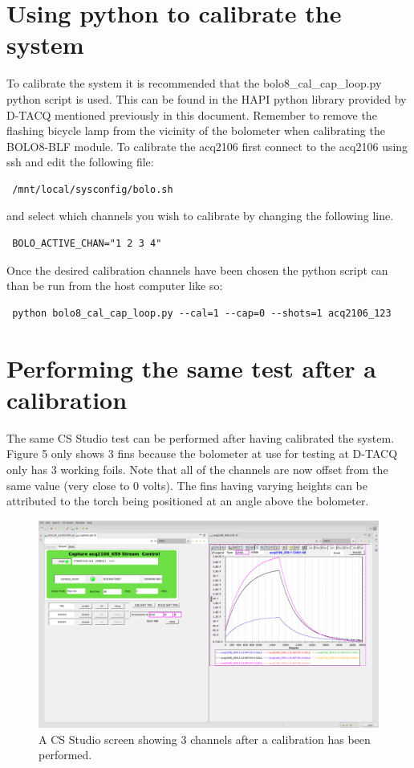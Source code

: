 \documentclass{article}
\begin{document}
\newpage

\section{Using python to calibrate the system}
To calibrate the system it is recommended that the bolo8\_cal\_cap\_loop.py python script is used.
This can be found in the HAPI python library provided by D-TACQ mentioned previously in this document.
Remember to remove the flashing bicycle lamp from the vicinity of the bolometer when calibrating the BOLO8-BLF module.
\newline
To calibrate the acq2106 first connect to the acq2106 using ssh and edit the following file:

\begin{verbatim} /mnt/local/sysconfig/bolo.sh \end{verbatim}

and select which channels you wish to calibrate by changing the following line.

\begin{verbatim} BOLO_ACTIVE_CHAN="1 2 3 4" \end{verbatim}

Once the desired calibration channels have been chosen the python script can than be run from the host computer like so:

\begin{verbatim} python bolo8_cal_cap_loop.py --cal=1 --cap=0 --shots=1 acq2106_123\end{verbatim}

\newpage

\section{Performing the same test after a calibration}
The same CS Studio test can be performed after having calibrated the system.
Figure 5 only shows 3 fins because the bolometer at use for testing at D-TACQ only has 3 working foils.
Note that all of the channels are now offset from the same value (very close to 0 volts).
The fins having varying heights can be attributed to the torch being positioned at an angle above the bolometer.

\begin{figure}
	\centering
	\includegraphics[width=5.0in]{images/3-fins.png}
	\caption{A CS Studio screen showing 3 channels after a calibration has been performed.}
	\label{boloZIFimage}
\end{figure}
\end{document}
